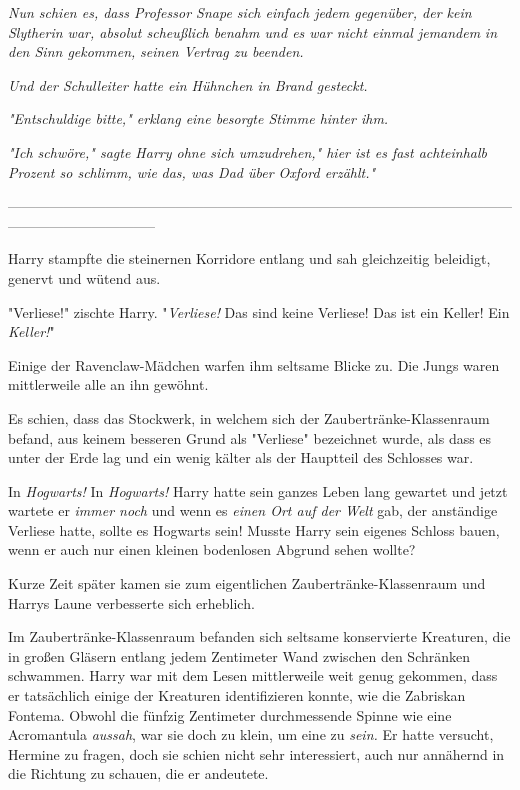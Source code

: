 {\emph{Nun schien es, dass Professor Snape sich einfach jedem gegenüber, der kein Slytherin war, absolut scheußlich benahm und es war nicht einmal jemandem} \emph{\emph{in den Sinn gekommen,}} \emph{seinen Vertrag zu beenden.}

\emph{Und der Schulleiter hatte ein Hühnchen in Brand gesteckt.}

\emph{"Entschuldige bitte," erklang eine besorgte Stimme hinter ihm.}

\emph{"Ich schwöre," sagte Harry ohne sich umzudrehen," hier ist es fast achteinhalb Prozent so schlimm, wie} \emph{das, was Dad über Oxford erzählt."}

--------------------------------------------------------------------------------------------------------------------------------------------

Harry stampfte die steinernen Korridore entlang und sah gleichzeitig beleidigt, genervt und wütend aus.

"Verliese!" zischte Harry. "\emph{Verliese!} Das sind keine Verliese! Das ist ein Keller! Ein \emph{Keller!}"

Einige der Ravenclaw-Mädchen warfen ihm seltsame Blicke zu. Die Jungs waren mittlerweile alle an ihn gewöhnt.

Es schien, dass das Stockwerk, in welchem sich der Zaubertränke-Klassenraum befand, aus keinem besseren Grund als "Verliese" bezeichnet wurde, als dass es unter der Erde lag und ein wenig kälter als der Hauptteil des Schlosses war.

In \emph{Hogwarts!} In \emph{Hogwarts!} Harry hatte sein ganzes Leben lang gewartet und jetzt wartete er \emph{immer noch} und wenn es \emph{einen Ort auf der Welt} gab, der anständige Verliese hatte, sollte es Hogwarts sein! Musste Harry sein eigenes Schloss bauen, wenn er auch nur einen kleinen bodenlosen Abgrund sehen wollte?

Kurze Zeit später kamen sie zum eigentlichen Zaubertränke-Klassenraum und Harrys Laune verbesserte sich erheblich.

Im Zaubertränke-Klassenraum befanden sich seltsame konservierte Kreaturen, die in großen Gläsern entlang jedem Zentimeter Wand zwischen den Schränken schwammen. Harry war mit dem Lesen mittlerweile weit genug gekommen, dass er tatsächlich einige der Kreaturen identifizieren konnte, wie die Zabriskan Fontema. Obwohl die fünfzig Zentimeter durchmessende Spinne wie eine Acromantula \emph{aussah}, war sie doch zu klein, um eine zu \emph{sein.} Er hatte versucht, Hermine zu fragen, doch sie schien nicht sehr interessiert, auch nur annähernd in die Richtung zu schauen, die er andeutete.

}
